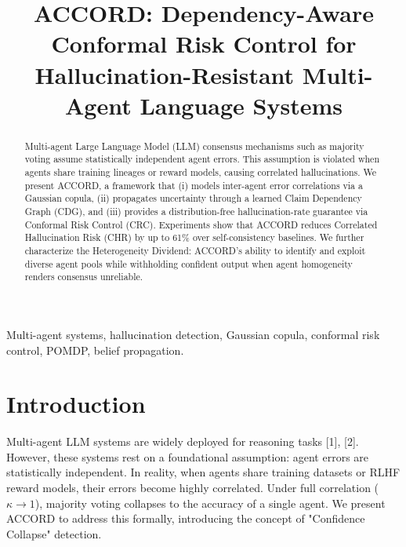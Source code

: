 \documentclass[conference]{IEEEtran}
\begin{document}
\title{ACCORD: Dependency-Aware Conformal Risk Control for Hallucination-Resistant Multi-Agent Language Systems}

\author{
}

\maketitle

\begin{abstract}
Multi-agent Large Language Model (LLM) consensus mechanisms such as majority voting assume statistically independent agent errors. This assumption is violated when agents share training lineages or reward models, causing correlated hallucinations. We present ACCORD, a framework that (i) models inter-agent error correlations via a Gaussian copula, (ii) propagates uncertainty through a learned Claim Dependency Graph (CDG), and (iii) provides a distribution-free hallucination-rate guarantee via Conformal Risk Control (CRC). Experiments show that ACCORD reduces Correlated Hallucination Risk (CHR) by up to 61\% over self-consistency baselines. We further characterize the Heterogeneity Dividend: ACCORD's ability to identify and exploit diverse agent pools while withholding confident output when agent homogeneity renders consensus unreliable.
\end{abstract}

\begin{IEEEkeywords}
Multi-agent systems, hallucination detection, Gaussian copula, conformal risk control, POMDP, belief propagation.
\end{IEEEkeywords}

\section{Introduction}
Multi-agent LLM systems are widely deployed for reasoning tasks [1], [2]. However, these systems rest on a foundational assumption: agent errors are statistically independent. In reality, when agents share training datasets or RLHF reward models, their errors become highly correlated. Under full correlation ($\kappa \to 1$), majority voting collapses to the accuracy of a single agent. We present ACCORD to address this formally, introducing the concept of "Confidence Collapse" detection.
\end{document}
